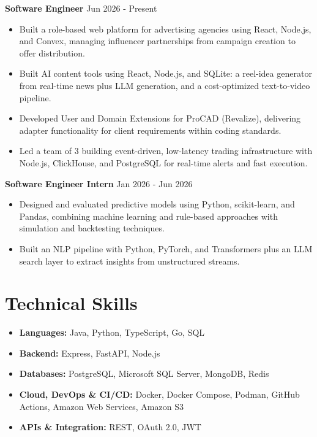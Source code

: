 \documentclass[a4paper,11pt]{article}
\newcommand{\resumeItem}[1]{\item \small{#1}}
\newcommand{\resumeSubHeadingListStart}{\begin{itemize}}
\newcommand{\resumeSubHeadingListEnd}{\end{itemize}}
\begin{document}
\textbf{Software Engineer} \hfill {Jun 2026 - Present}
\resumeSubHeadingListStart
\resumeItem{Built a role-based web platform for advertising agencies using React, Node.js, and Convex, managing influencer partnerships from campaign creation to offer distribution.}
\resumeItem{Built AI content tools using React, Node.js, and SQLite: a reel-idea generator from real-time news plus LLM generation, and a cost-optimized text-to-video pipeline.}
\resumeItem{Developed User and Domain Extensions for ProCAD (Revalize), delivering adapter functionality for client requirements within coding standards.}
\resumeItem{Led a team of 3 building event-driven, low-latency trading infrastructure with Node.js, ClickHouse, and PostgreSQL for real-time alerts and fast execution.}
\resumeSubHeadingListEnd

\textbf{Software Engineer Intern} \hfill {Jan 2026 - Jun 2026}
\resumeSubHeadingListStart
\resumeItem{Designed and evaluated predictive models using Python, scikit-learn, and Pandas, combining machine learning and rule-based approaches with simulation and backtesting techniques.}
\resumeItem{Built an NLP pipeline with Python, PyTorch, and Transformers plus an LLM search layer to extract insights from unstructured streams.}
\resumeSubHeadingListEnd


\section*{Technical Skills}
\begin{itemize}
\item \textbf{Languages:} Java, Python, TypeScript, Go, SQL
\item \textbf{Backend:} Express, FastAPI, Node.js
\item \textbf{Databases:} PostgreSQL, Microsoft SQL Server, MongoDB, Redis
\item \textbf{Cloud, DevOps \& CI/CD:} Docker, Docker Compose, Podman, GitHub Actions, Amazon Web Services, Amazon S3
\item \textbf{APIs \& Integration:} REST, OAuth 2.0, JWT
\end{itemize}
\vspace{-0.2em}


\end{document}
